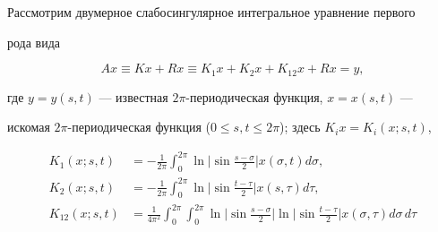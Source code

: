  


\date{} 




\pagestyle{plain} %


 




\maketitle 


\label{begin} 


 


 


Рассмотрим двумерное слабосингулярное интегральное уравнение первого  


рода вида 


\begin{equation} 


Ax\equiv Kx+Rx\equiv K_1x+K_2x+K_{12}x+Rx=y, 


\end{equation} 


где $y=y(s,t)$ --- известная $2\pi$-периодическая функция, $x=x(s,t)$ --- 


искомая $2\pi$-периодическая функция ($0\le s,t\le2\pi$); здесь $K_i 


x=K_i(x;s,t)$, 


\begin{align*} 


K_1(x;s,t)&=-\frac{1}{2\pi}\int^{2\pi}_0\ln 


\bigg|\sin\frac{s-\sigma}{2}\bigg|x(\sigma,t)d\sigma,\\ 


% 


K_2(x;s,t)&=-\frac{1}{2\pi}\int^{2\pi}_0\ln 


\bigg|\sin\frac{t-\tau}{2}\bigg|x(s,\tau)d\tau, \\ 


%


K_{12}(x;s,t)&=\frac{1}{4\pi^2}\int^{2\pi}_0\int^{2\pi}_0 


\ln\bigg|\sin\frac{s-\sigma}{2}\bigg|\ln 


\bigg|\sin\frac{t-\tau}{2}\bigg|x(\sigma,\tau)d\sigma\,d\tau 


\end{align*} 



